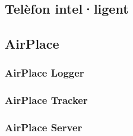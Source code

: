 
\subsection{Telèfon intel·ligent}

\subsection{AirPlace}

\subsubsection{AirPlace Logger}

\subsubsection{AirPlace Tracker}

\subsubsection{AirPlace Server}
